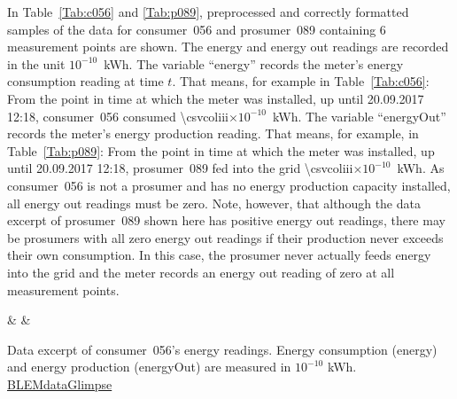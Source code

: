 In Table~\ref{Tab:c056} and \ref{Tab:p089}, preprocessed and correctly formatted samples of the data for consumer~056 and prosumer~089 containing 6 measurement points are shown. The energy and energy out readings are recorded in the unit $10^{-10}$~kWh. The variable ``energy'' records the meter's energy consumption reading at time $t$. That means, for example in Table~\ref{Tab:c056}: From the point in time at which the meter was installed, up until 20.09.2017 12:18, consumer~056 consumed %
{\num{\csvcoliii}}$\times 10^{-10}$~kWh. The variable ``energyOut'' records the meter's energy production reading. That means, for example, in Table~\ref{Tab:p089}: From the point in time at which the meter was installed, up until 20.09.2017 12:18, prosumer~089 fed into the grid %
{\num{\csvcoliii}}$\times10^{-10}$~kWh. As consumer~056 is not a prosumer and has no energy production capacity installed, all energy out readings must be zero. Note, however, that although the data excerpt of prosumer~089 shown here has positive energy out readings, there may be prosumers with all zero energy out readings if their production never exceeds their own consumption. In this case, the prosumer never actually feeds energy into the grid and the meter records an energy out reading of zero at all measurement points.
%
\begin{table}[htbp]
    {\csvcolii & \csvcoliii & \csvcoliv}%
    \caption[Data excerpt of consumer~056's energy readings]{Data excerpt of consumer~056's energy readings. Energy consumption (energy) and energy production (energyOut) are measured in $10^{-10}$ kWh. \quantnet\href{https://github.com/QuantLet/BLEM/tree/master/BLEMdataGlimpse}{BLEMdataGlimpse}}
    \label{Tab:c056}
\end{table}
%
%
